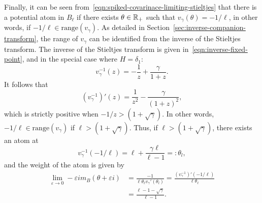 \documentclass{article}
\newcommand{\range}{\mathrm{range}}
\begin{document}
Finally, it can be seen from~\eqref{eqn:spiked-covarinace-limiting-stieltjes} that there is a potential atom in $B_{\ell}$ if there exists $\theta \in \mathbb{R}_{+}$ such that $v_{\gamma}(\theta) = -1/\ell$, in other words, if $-1/\ell \in \range(v_{\gamma})$. As detailed in Section~\ref{sec:inverse-companion-transform}, the range of $v_{\gamma}$ can be identified from the inverse of the Stieltjes transform. The inverse of the Stieltjes transform is given in~\eqref{eqn:inverse-fixed-point}, and in the special case where $H = \delta_1$:
$$
v_{\gamma}^{-1}(z) = -\frac{1}{z} + \frac{\gamma}{1 + z}.
$$
It follows that
$$
(v_{\gamma}^{-1})'(z) = \frac{1}{z^2} - \frac{\gamma}{(1 + z)^2},
$$
which is strictly positive when $-1/z > (1 + \sqrt{\gamma})$. In other words, $-1/\ell \in \range(v_{\gamma})$ if $\ell > (1 + \sqrt{\gamma})$. Thus, if $\ell > (1 + \sqrt{\gamma})$, there exists an atom at 
$$
v_{\gamma}^{-1}(-1/\ell) = \ell + \frac{\gamma \ell}{\ell - 1} =: \theta_l,
$$
and the weight of the atom is given by
\begin{align*}
\lim_{\varepsilon \to 0} - \varepsilon i m_{B}(\theta + \varepsilon i) 
& = \frac{-1}{\ell \theta_\ell v_{\gamma}'(\theta_l)} = \frac{(v_{\gamma}^{-1})'(-1/\ell)}{\ell \theta_{\ell}} \\
& = \frac{\ell - 1 - \sqrt{\gamma}}{\ell - 1}.
\end{align*}


	
	
\end{document}
